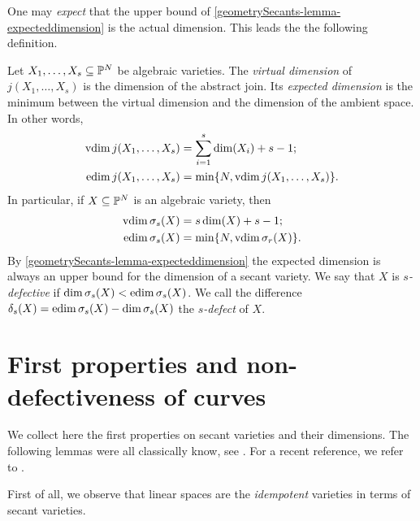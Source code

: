 One may {\it expect} that the upper bound of \ref{geometrySecants-lemma-expecteddimension} is the actual dimension. This leads the the following definition. 
\begin{definition}
\label{geometrySecants-definition-expecteddimension}
    Let $X_1, \ldots , X_s \subseteq \mathbb{P}^N$ be algebraic varieties. The {\it virtual dimension} of $j(X_1,\ldots,X_s)$ is the dimension of the abstract join. Its {\it expected dimension} is the minimum between the virtual dimension and the dimension of the ambient space. In other words,
    \begin{align*}
        \operatorname{vdim} j(X_1,\ldots,X_s) & = \sum_{i=1}^s \dim(X_i) + s-1; \\ 
        \operatorname{edim} j(X_1,\ldots,X_s) & = \min \{N,\operatorname{vdim} j(X_1,\ldots,X_s)\}.
    \end{align*}
    In particular, if $X \subseteq \mathbb{P}^N$ is an algebraic variety, then
    \begin{align*}
        \operatorname{vdim} \sigma_s(X) & = s\dim(X) + s-1; \\ 
        \operatorname{edim} \sigma_s(X) & = \min \{N,\operatorname{vdim} \sigma_r(X)\}.
    \end{align*}
By \ref{geometrySecants-lemma-expecteddimension} the expected dimension is always an upper bound for the dimension of a secant variety. We say that $X$ is \emph{$s$-defective} if $\dim \sigma_s(X) < \operatorname{edim}\sigma_s(X)$. We call the difference $\delta_s(X) = \operatorname{edim}\sigma_s(X) - \dim \sigma_s(X)$ the \emph{$s$-defect} of $X$. 

\end{definition}

\section{First properties and non-defectiveness of curves}
\label{geometrySecants-section-first_properties}

We collect here the first properties on secant varieties and their dimensions. The following lemmas were all classically know, see \cite{Pal09}. For a recent reference, we refer to \cite{Rus16}.

First of all, we observe that linear spaces are the \emph{idempotent} varieties in terms of secant varieties. 

